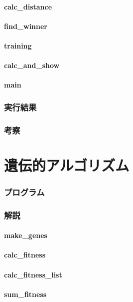 \documentclass{jsarticle}
\begin{document}
\subsection{calc\_distance}
\subsection{find\_winner}
\subsection{training}
\subsection{calc\_and\_show}
\subsection{main}
\section{実行結果}
\section{考察}

\part{遺伝的アルゴリズム}
\section{プログラム}


\section{解説}
\subsection{make\_genes}
\subsection{calc\_fitness}
\subsection{calc\_fitness\_list}
\subsection{sum\_fitness}
\end{document}
